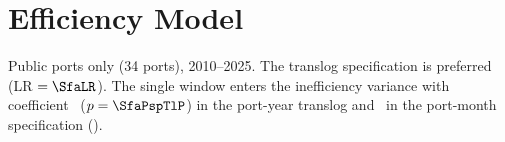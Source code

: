 \section{Efficiency Model}
\label{sec:efficiency}


Public ports only (34 ports), 2010--2025. The translog specification is
preferred (LR $=\SfaLR$). The single window enters the inefficiency variance
with coefficient \SfaPspTl\ ($p=\SfaPspTlP$) in the port-year translog and
\SfaPspPm\ in the port-month specification ().



\PROSA

\FloatBarrier

